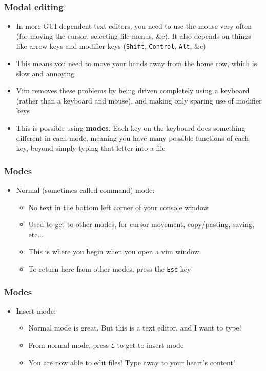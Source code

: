 \documentclass{beamer}
\begin{document}
\begin{frame}
    \frametitle{Modal editing}
    \pause
    \begin{itemize}
        \item In more GUI-dependent text editors, you need to use the mouse very often (for moving the cursor, selecting file menus, \&c). It also depends on things like arrow keys and modifier keys (\texttt{Shift}, \texttt{Control}, \texttt{Alt}, \&c)
        \pause
        \item This means you need to move your hands away from the home row, which is slow and annoying
        \pause
        \item Vim removes these problems by being driven completely using a keyboard (rather than a keyboard and mouse), and making only sparing use of modifier keys
        \pause
        \item This is possible using \textbf{modes}. Each key on the keyboard does something different in each mode, meaning you have many possible functions of each key, beyond simply typing that letter into a file
    \end{itemize}
\end{frame}

\begin{frame}
    \frametitle{Modes}
    \pause
    \begin{itemize}
        \item Normal (sometimes called command) mode:
        \begin{itemize}
            \item No text in the bottom left corner of your console window
            \item Used to get to other modes, for cursor movement, copy/pasting, saving, etc...
            \item This is where you begin when you open a vim window
            \item To return here from other modes, press the \texttt{Esc} key
        \end{itemize}
    \end{itemize}
\end{frame}

\begin{frame}
    \frametitle{Modes}
    \begin{itemize}
        \item Insert mode:
        \begin{itemize}
            \item Normal mode is great. But this is a text editor, and I want to type!
            \pause
            \item From normal mode, press \texttt{i} to get to insert mode
            \item You are now able to edit files! Type away to your heart's content!
        \end{itemize}
    \end{itemize}
\end{frame}
\end{document}
